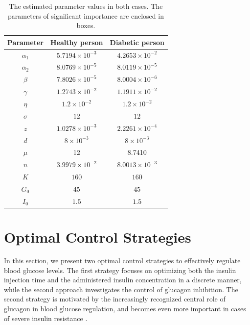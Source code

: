 \documentclass[a4paper,fleqn]{cas-sc}
\numberwithin{equation}{section}
\numberwithin{equation}{section}
\newcommand{\1}{\boldsymbol{1}}
\newcommand{\0}{\boldsymbol{0}}
\begin{document}
\begin{table}[H]
\centering
    \begin{tabular}{ccc}
       \hline
       \textbf{Parameter} & \textbf{Healthy person}  & \textbf{Diabetic person} \\
       \hline
       $\alpha_1$ & $5.7194 \times 10^{-3}$ & $4.2653 \times 10^{-2}$ \\
       $\alpha_2$ & $8.0769 \times 10^{-5}$ & $8.0119 \times 10^{-5}$ \\
       $\beta$    & $7.8026 \times 10^{-5}$ & $8.0004 \times 10^{-6}$ \\
       $\gamma$   & $1.2743 \times 10^{-2}$ & $1.1911 \times 10^{-2}$ \\
       $\eta$     & $1.2 \times 10^{-2}$    & $1.2 \times 10^{-2}$ \\
       $\sigma$   & $12$                    & $12$ \\
       $z$        & $1.0278 \times 10^{-3}$ & $2.2261 \times 10^{-4}$ \\
       $d$        & $8 \times 10^{-3}$      & $8 \times 10^{-3}$ \\
       $\mu$      & 12                      & 8.7410 \\
       $n$        & $3.9979 \times 10^{-2}$ & $8.0013 \times 10^{-3}$ \\
       $K$        & $160$                   & $160$ \\
       $G_0$      & $45$                    & $45$ \\
       $I_0$      & $1.5 $                  & $1.5 $ \\
       \hline
   \end{tabular}


\caption{The estimated parameter values in both cases. The parameters of significant importance are enclosed in boxes.}
\label{table: parameter}
\end{table}

\section{Optimal Control Strategies}
In this section, we present two optimal control strategies to effectively regulate blood glucose levels. The first strategy focuses on optimizing both the insulin injection time and the administered insulin concentration in a discrete manner, while the second approach investigates the control of glucagon inhibition. The second strategy is motivated by the increasingly recognized central role of glucagon in blood glucose regulation, and becomes even more important in cases of severe insulin resistance \cite{gromada2007alpha,lund2014glucagon,GodoyMatos2014GlucagonT2D,haedersdal2018role,UngerCherrington2012Glucagonocentric}.
\end{document}
